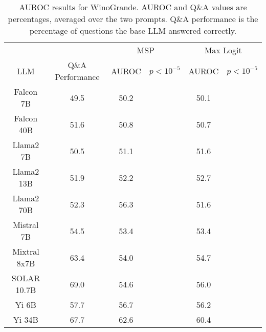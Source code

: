 \begin{table*}
\centering
\begin{tabular}{c|c|c|c|c|c}
& & \multicolumn{2}{c|}{MSP} & \multicolumn{2}{c}{Max Logit} \\ 
LLM & Q\&A Performance & AUROC & $p < 10^{-5}$ & AUROC & $p < 10^{-5}$\\ \hline
Falcon 7B & 49.5 & 50.2 &  & 50.1 & \\
Falcon 40B & 51.6 & 50.8 &  & 50.7 & \\
Llama2 7B & 50.5 & 51.1 &  & 51.6 & \\
Llama2 13B & 51.9 & 52.2 &  & 52.7 & \\
Llama2 70B & 52.3 & 56.3 &  & 51.6 & \\
Mistral 7B & 54.5 & 53.4 &  & 53.4 & \\
Mixtral 8x7B & 63.4 & 54.0 &  & 54.7 & \\
SOLAR 10.7B & 69.0 & 54.6 &  & 56.0 & \\
Yi 6B & 57.7 & 56.7 &  & 56.2 & \\
Yi 34B & 67.7 & 62.6 &  & 60.4 & \\
\hline
\end{tabular}
\caption{AUROC results for WinoGrande. AUROC and Q\&A values are percentages, averaged over the two prompts. Q\&A performance is the percentage of questions the base LLM answered correctly.}
\label{tab:winogrande_auroc}
\end{table*}
